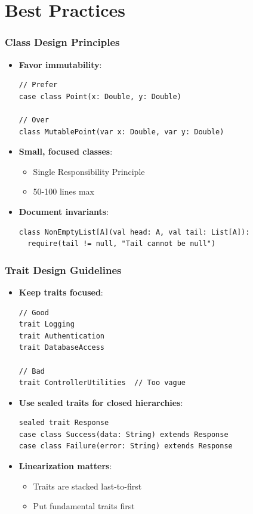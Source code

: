 \documentclass{beamer}
\begin{document}
\section{Best Practices}
\begin{frame}[fragile]
\frametitle{Class Design Principles}
\begin{itemize}
\item \textbf{Favor immutability}:
\begin{lstlisting}[style=scala]
// Prefer
case class Point(x: Double, y: Double)

// Over
class MutablePoint(var x: Double, var y: Double)
\end{lstlisting}

\item \textbf{Small, focused classes}:
\begin{itemize}
\item Single Responsibility Principle
\item 50-100 lines max
\end{itemize}

\item \textbf{Document invariants}:
\begin{lstlisting}[style=scala]
class NonEmptyList[A](val head: A, val tail: List[A]):
  require(tail != null, "Tail cannot be null")
\end{lstlisting}
\end{itemize}
\end{frame}

\begin{frame}[fragile]
\frametitle{Trait Design Guidelines}
\begin{itemize}
\item \textbf{Keep traits focused}:
\begin{lstlisting}[style=scala]
// Good
trait Logging
trait Authentication
trait DatabaseAccess

// Bad
trait ControllerUtilities  // Too vague
\end{lstlisting}

\item \textbf{Use sealed traits for closed hierarchies}:
\begin{lstlisting}[style=scala]
sealed trait Response
case class Success(data: String) extends Response
case class Failure(error: String) extends Response
\end{lstlisting}

\item \textbf{Linearization matters}:
\begin{itemize}
\item Traits are stacked last-to-first
\item Put fundamental traits first
\end{itemize}
\end{itemize}
\end{frame}
\end{document}
